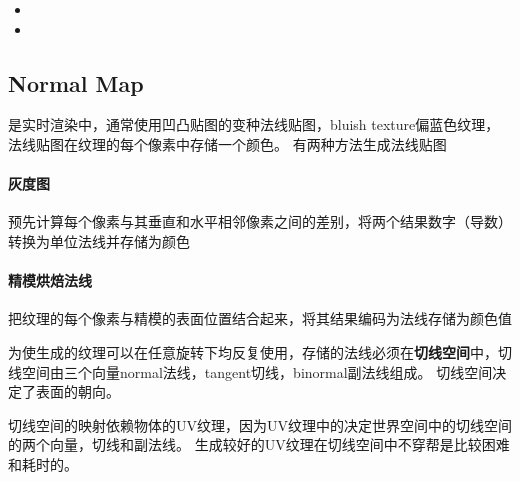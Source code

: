 \begin{itemize}
    \item {}
    \item {}
\end{itemize}

\subsection{Normal Map}

是实时渲染中，通常使用凹凸贴图的变种法线贴图，bluish texture偏蓝色纹理，法线贴图在纹理的每个像素中存储一个颜色。
有两种方法生成法线贴图
\paragraph{灰度图}
预先计算每个像素与其垂直和水平相邻像素之间的差别，将两个结果数字（导数）转换为单位法线并存储为颜色
\paragraph{精模烘焙法线}
把纹理的每个像素与精模的表面位置结合起来，将其结果编码为法线存储为颜色值

为使生成的纹理可以在任意旋转下均反复使用，存储的法线必须在\textbf{切线空间}中，切线空间由三个向量normal法线，tangent切线，binormal副法线组成。
切线空间决定了表面的朝向。

切线空间的映射依赖物体的UV纹理，因为UV纹理中的决定世界空间中的切线空间的两个向量，切线和副法线。
生成较好的UV纹理在切线空间中不穿帮是比较困难和耗时的。

